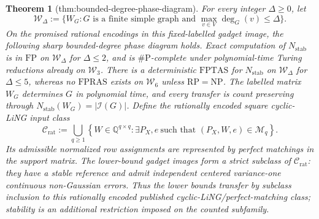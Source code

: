 \documentclass{article}
\newtheorem{theorem}{Theorem}
\begin{document}
\begin{theorem}[thm:bounded-degree-phase-diagram]\label{thm:bounded-degree-phase-diagram}
For every integer \(\Delta\geq0\), let
\[
 \mathcal W_\Delta
 :=\{W_G:G\text{ is a finite simple graph and }\max_{v\in V}\deg_G(v)\leq\Delta\}.
\]
On the promised rational encodings in this fixed-labelled gadget image, the following sharp bounded-degree phase diagram holds.  Exact computation of \(N_{\mathrm{stab}}\) is in \(\mathrm{FP}\) on \(\mathcal W_\Delta\) for \(\Delta\leq2\), and is \(\#\mathrm P\)-complete under polynomial-time Turing reductions already on \(\mathcal W_3\).  There is a deterministic \(\mathrm{FPTAS}\) for \(N_{\mathrm{stab}}\) on \(\mathcal W_\Delta\) for \(\Delta\leq5\), whereas no \(\mathrm{FPRAS}\) exists on \(\mathcal W_6\) unless \(\mathrm{RP}=\mathrm{NP}\).  The labelled matrix \(W_G\) determines \(G\) in polynomial time, and every transfer is count preserving through \(N_{\mathrm{stab}}(W_G)=|\mathcal I(G)|\).  Define the rationally encoded square cyclic-LiNG input class
\[
 \mathcal C_{\mathrm{rat}}
 :=\bigcup_{q\geq1}
 \left\{W\in\mathbb Q^{q\times q}:
 \exists P_X,e\ \text{such that }(P_X,W,e)\in\mathcal M_q\right\}.
\]
Its admissible normalized row assignments are represented by perfect matchings in the support matrix.  The lower-bound gadget images form a strict subclass of \(\mathcal C_{\mathrm{rat}}\): they have a stable reference and admit independent centered variance-one continuous non-Gaussian errors.  Thus the lower bounds transfer by subclass inclusion to this rationally encoded published cyclic-LiNG/perfect-matching class; stability is an additional restriction imposed on the counted subfamily.
\end{theorem}
\end{document}
